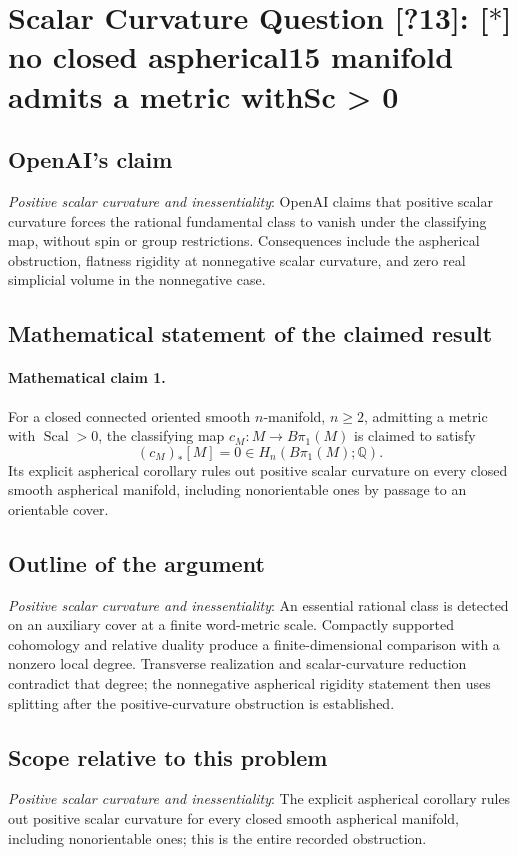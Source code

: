 \documentclass[11pt]{article}
\begin{document}
\section*{Scalar Curvature Question [?13]: [\(\ast\)] no closed aspherical15 manifold admits a metric withSc > 0}

\subsection{OpenAI's claim}
\textit{Positive scalar curvature and inessentiality}: OpenAI claims that positive scalar curvature forces the rational fundamental class to vanish under the classifying map, without spin or group restrictions. Consequences include the aspherical obstruction, flatness rigidity at nonnegative scalar curvature, and zero real simplicial volume in the nonnegative case.

\subsection{Mathematical statement of the claimed result}
\paragraph{Mathematical claim 1.} For a closed connected oriented smooth $n$-manifold, $n\ge2$, admitting a metric with $\operatorname{Scal}>0$, the classifying map $c_M:M\to B\pi_1(M)$ is claimed to satisfy \[(c_M)_*[M]=0\in H_n(B\pi_1(M);\mathbb Q).\] Its explicit aspherical corollary rules out positive scalar curvature on every closed smooth aspherical manifold, including nonorientable ones by passage to an orientable cover.

\subsection{Outline of the argument}
\textit{Positive scalar curvature and inessentiality}: An essential rational class is detected on an auxiliary cover at a finite word-metric scale. Compactly supported cohomology and relative duality produce a finite-dimensional comparison with a nonzero local degree. Transverse realization and scalar-curvature reduction contradict that degree; the nonnegative aspherical rigidity statement then uses splitting after the positive-curvature obstruction is established.

\subsection{Scope relative to this problem}
\textit{Positive scalar curvature and inessentiality}: The explicit aspherical corollary rules out positive scalar curvature for every closed smooth aspherical manifold, including nonorientable ones; this is the entire recorded obstruction.
\end{document}
